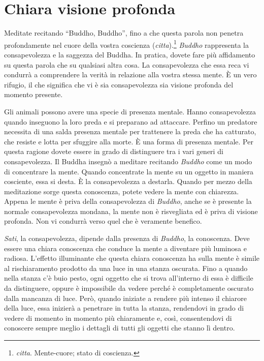 \chapter{Chiara visione profonda}

Meditate recitando ``Buddho, Buddho'', fino a che questa parola non
penetra profondamente nel cuore della vostra coscienza
(\emph{citta}).\footnote{\emph{citta}. Mente-cuore; stato di coscienza.}
\emph{Buddho} rappresenta la consapevolezza e la saggezza del Buddha. In
pratica, dovete fare più affidamento su questa parola che su qualsiasi
altra cosa. La consapevolezza che essa reca vi condurrà a comprendere la
verità in relazione alla vostra stessa mente. È un vero rifugio, il che
significa che vi è sia consapevolezza sia visione profonda del momento
presente.

Gli animali possono avere una specie di presenza mentale. Hanno
consapevolezza quando inseguono la loro preda e si preparano ad
attaccare. Perfino un predatore necessita di una salda presenza mentale
per trattenere la preda che ha catturato, che resiste e lotta per
sfuggire alla morte. È una forma di presenza mentale. Per questa ragione
dovete essere in grado di distinguere tra i vari generi di
consapevolezza. Il Buddha insegnò a meditare recitando \emph{Buddho}
come un modo di concentrare la mente. Quando concentrate la mente su un
oggetto in maniera cosciente, essa si desta. È la consapevolezza a
destarla. Quando per mezzo della meditazione sorge questa conoscenza,
potete vedere la mente con chiarezza. Appena le mente è priva della
consapevolezza di \emph{Buddho}, anche se è presente la normale
consapevolezza mondana, la mente non è risvegliata ed è priva di visione
profonda. Non vi condurrà verso quel che è veramente benefico.

\emph{Sati}, la consapevolezza, dipende dalla presenza di \emph{Buddho},
la conoscenza. Deve essere una chiara conoscenza che conduce la mente a
diventare più luminosa e radiosa. L'effetto illuminante che questa
chiara conoscenza ha sulla mente è simile al rischiaramento prodotto da
una luce in una stanza oscurata. Fino a quando nella stanza c'è buio
pesto, ogni oggetto che si trova all'interno di essa è difficile da
distinguere, oppure è impossibile da vedere perché è completamente
oscurato dalla mancanza di luce. Però, quando iniziate a rendere più
intenso il chiarore della luce, essa inizierà a penetrare in tutta la
stanza, rendendovi in grado di vedere di momento in momento più
chiaramente e, così, consentendovi di conoscere sempre meglio i dettagli
di tutti gli oggetti che stanno lì dentro.


